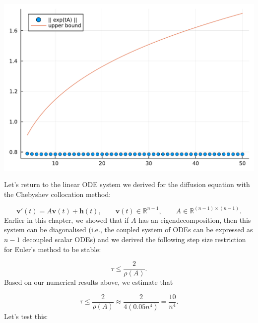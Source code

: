 \documentclass[12pt,a4paper]{article}
\begin{document}
\includegraphics[width=\linewidth]{jl_Vz6qXN/Chapter5_49_1.pdf}

Let's return to the linear ODE system we derived for the diffusion equation with the Chebyshev collocation method:

\[
\mathbf{v}'(t) = A\mathbf{v}(t) + \mathbf{h}(t), \qquad \mathbf{v}(t) \in \mathbb{R}^{n-1}, \qquad A \in \mathbb{R}^{(n-1)\times (n-1)}.
\]
Earlier in this chapter, we showed that if $A$ has an eigendecomposition, then this system can be diagonalised (i.e., the coupled system of ODEs can be expressed as $n-1$ decoupled scalar ODEs) and we derived the following step size restriction for Euler's method to be stable:

\[
\tau \leq \frac{2}{\rho(A)}.
\]
Based on our numerical results above, we estimate that

\[
\tau \leq \frac{2}{\rho(A)} \approx \frac{2}{4(0.05n^4)} = \frac{10}{n^4}.
\]
Let's test this:
\end{document}
